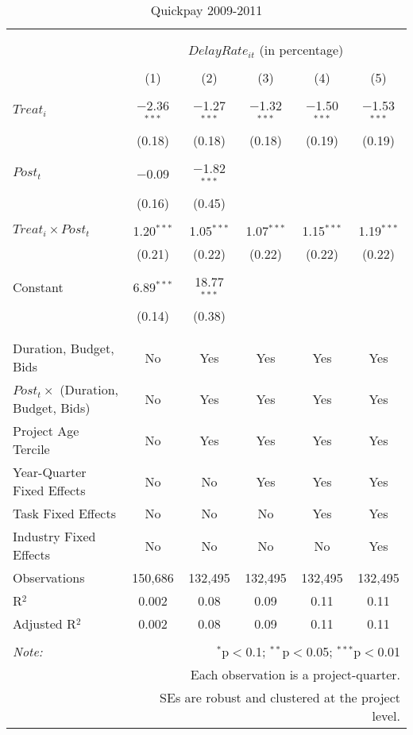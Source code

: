 \documentclass[
]{article}
\begin{document}
\begin{table}[H] \centering 
  \caption{Quickpay 2009-2011} 
  \label{} 
\small 
\begin{tabular}{@{\extracolsep{-2pt}}lccccc} 
\\[-1.8ex]\hline 
\hline \\[-1.8ex] 
\\[-1.8ex] & \multicolumn{5}{c}{$DelayRate_{it}$ (in percentage)} \\ 
\\[-1.8ex] & (1) & (2) & (3) & (4) & (5)\\ 
\hline \\[-1.8ex] 
 $Treat_i$ & $-$2.36$^{***}$ & $-$1.27$^{***}$ & $-$1.32$^{***}$ & $-$1.50$^{***}$ & $-$1.53$^{***}$ \\ 
  & (0.18) & (0.18) & (0.18) & (0.19) & (0.19) \\ 
  & & & & & \\ 
 $Post_t$ & $-$0.09 & $-$1.82$^{***}$ &  &  &  \\ 
  & (0.16) & (0.45) &  &  &  \\ 
  & & & & & \\ 
 $Treat_i \times Post_t$ & 1.20$^{***}$ & 1.05$^{***}$ & 1.07$^{***}$ & 1.15$^{***}$ & 1.19$^{***}$ \\ 
  & (0.21) & (0.22) & (0.22) & (0.22) & (0.22) \\ 
  & & & & & \\ 
 Constant & 6.89$^{***}$ & 18.77$^{***}$ &  &  &  \\ 
  & (0.14) & (0.38) &  &  &  \\ 
  & & & & & \\ 
\hline \\[-1.8ex] 
Duration, Budget, Bids & No & Yes & Yes & Yes & Yes \\ 
$Post_t \times$  (Duration, Budget, Bids) & No & Yes & Yes & Yes & Yes \\ 
Project Age Tercile & No & Yes & Yes & Yes & Yes \\ 
Year-Quarter Fixed Effects & No & No & Yes & Yes & Yes \\ 
Task Fixed Effects & No & No & No & Yes & Yes \\ 
Industry Fixed Effects & No & No & No & No & Yes \\ 
Observations & 150,686 & 132,495 & 132,495 & 132,495 & 132,495 \\ 
R$^{2}$ & 0.002 & 0.08 & 0.09 & 0.11 & 0.11 \\ 
Adjusted R$^{2}$ & 0.002 & 0.08 & 0.09 & 0.11 & 0.11 \\ 
\hline 
\hline \\[-1.8ex] 
\textit{Note:}  & \multicolumn{5}{r}{$^{*}$p$<$0.1; $^{**}$p$<$0.05; $^{***}$p$<$0.01} \\ 
 & \multicolumn{5}{r}{Each observation is a project-quarter.} \\ 
 & \multicolumn{5}{r}{SEs are robust and clustered at the project level.} \\ 
\end{tabular} 
\end{table}
\end{document}
